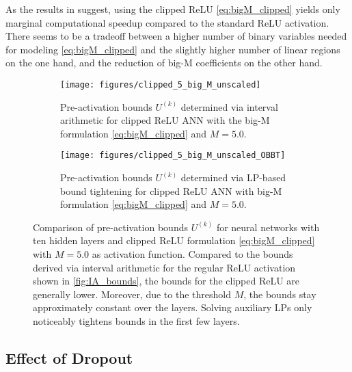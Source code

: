 As the results in  suggest, using the clipped ReLU  \eqref{eq:bigM_clipped} yields only marginal computational speedup compared to the standard ReLU activation. There seems to be a tradeoff between a higher number of binary variables needed for modeling \eqref{eq:bigM_clipped} and the slightly higher number of linear regions on the one hand, and the reduction of big-M coefficients on the other hand. 

\begin{figure}[ht!]
    \centering
    \begin{subfigure}{0.49\textwidth}
        \texttt{[image: figures/clipped\_5\_big\_M\_unscaled]}
        \caption{Pre-activation bounds $U^{(k)}$ determined via interval arithmetic for clipped ReLU ANN with the big-M formulation \eqref{eq:bigM_clipped} and $M=5.0$.}
        \label{fig:IA_bounds_clipped}
    \end{subfigure}
    \hfill
    \begin{subfigure}{0.49\textwidth}
        \texttt{[image: figures/clipped\_5\_big\_M\_unscaled\_OBBT]}
        \caption{Pre-activation bounds $U^{(k)}$ determined via LP-based bound tightening for clipped ReLU ANN with big-M formulation \eqref{eq:bigM_clipped} and $M=5.0$.}
        \label{fig:LR_bounds_clipped}
    \end{subfigure}
   
    \caption{Comparison of pre-activation bounds  $U^{(k)}$ for neural networks with ten hidden layers and clipped ReLU formulation \eqref{eq:bigM_clipped} with $M=5.0$ as activation function. Compared to the bounds derived via interval arithmetic for the regular ReLU activation shown in \vref{fig:IA_bounds}, the bounds for the clipped ReLU are generally lower. Moreover, due to the threshold $M$, the bounds stay approximately constant over the layers. Solving auxiliary LPs only noticeably tightens bounds in the first few layers.}
    \label{fig:big_Ms_clipped}
\end{figure}
 
\subsection{Effect of Dropout}


